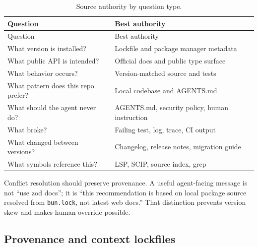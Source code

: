 \documentclass[
  11pt,
  letterpaper,
  numbers=noendperiod,
  parskip=half]{scrartcl}
\begin{document}
\begin{longtable}[]{@{}
  >{\raggedright\arraybackslash}p{}
  >{\raggedright\arraybackslash}p{}@{}}
\caption{Source authority by question
type.}\label{tbl-authority}\tabularnewline
\toprule\noalign{}
\begin{minipage}[b]{\linewidth}\raggedright
Question
\end{minipage} & \begin{minipage}[b]{\linewidth}\raggedright
Best authority
\end{minipage} \\
\midrule\noalign{}
\endfirsthead
\toprule\noalign{}
\begin{minipage}[b]{\linewidth}\raggedright
Question
\end{minipage} & \begin{minipage}[b]{\linewidth}\raggedright
Best authority
\end{minipage} \\
\midrule\noalign{}
\endhead
\bottomrule\noalign{}
\endlastfoot
What version is installed? & Lockfile and package manager metadata \\
What public API is intended? & Official docs and public type surface \\
What behavior occurs? & Version-matched source and tests \\
What pattern does this repo prefer? & Local codebase and AGENTS.md \\
What should the agent never do? & AGENTS.md, security policy, human
instruction \\
What broke? & Failing test, log, trace, CI output \\
What changed between versions? & Changelog, release notes, migration
guide \\
What symbols reference this? & LSP, SCIP, source index, grep \\
\end{longtable}

Conflict resolution should preserve provenance. A useful agent-facing
message is not ``use zod docs''; it is ``this recommendation is based on
local package source resolved from \texttt{bun.lock}, not latest web
docs.'' That distinction prevents version skew and makes human override
possible.

\subsection{Provenance and context lockfiles}\label{sec-provenance}
\end{document}
